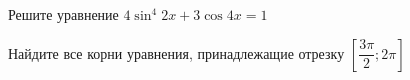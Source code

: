 \begin{ex}
	\begin{condition}
		\begin{enumcols}[label=\asbuk*)]
			\item Решите уравнение \( 4\sin^4 2x + 3\cos 4x = 1  \)
			\item Найдите все корни уравнения, принадлежащие отрезку \( \left[\dfrac{3\pi}{2};2\pi\right]  \)
		\end{enumcols}
	\end{condition}
\end{ex}